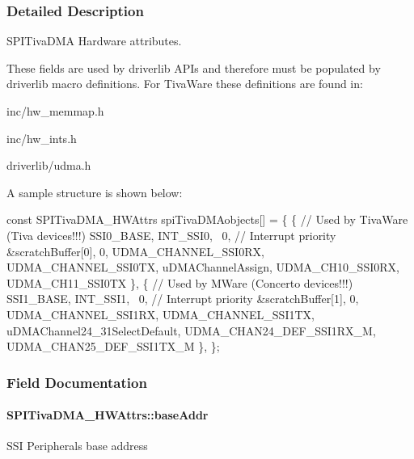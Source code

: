\subsubsection{Detailed Description}
S\+P\+I\+Tiva\+D\+M\+A Hardware attributes. 

These fields are used by driverlib A\+P\+Is and therefore must be populated by driverlib macro definitions. For Tiva\+Ware these definitions are found in\+:
\begin{DoxyItemize}
\item inc/hw\+\_\+memmap.\+h
\item inc/hw\+\_\+ints.\+h
\item driverlib/udma.\+h
\end{DoxyItemize}

A sample structure is shown below\+: 
\begin{DoxyCode}
\textcolor{keyword}{const} SPITivaDMA_HWAttrs spiTivaDMAobjects[] = \{
    \{   \textcolor{comment}{// Used by TivaWare (Tiva devices!!!)}
        SSI0\_BASE,
        INT\_SSI0,
        ~0,         \textcolor{comment}{// Interrupt priority}
        &scratchBuffer[0],
        0,
        UDMA\_CHANNEL\_SSI0RX,
        UDMA\_CHANNEL\_SSI0TX,
        uDMAChannelAssign,
        UDMA\_CH10\_SSI0RX,
        UDMA\_CH11\_SSI0TX
    \},
    \{   \textcolor{comment}{// Used by MWare (Concerto devices!!!)}
        SSI1\_BASE,
        INT\_SSI1,
        ~0,         \textcolor{comment}{// Interrupt priority}
        &scratchBuffer[1],
        0,
        UDMA\_CHANNEL\_SSI1RX,
        UDMA\_CHANNEL\_SSI1TX,
        uDMAChannel24\_31SelectDefault,
        UDMA\_CHAN24\_DEF\_SSI1RX\_M,
        UDMA\_CHAN25\_DEF\_SSI1TX\_M
    \},
\};
\end{DoxyCode}
 

\subsubsection{Field Documentation}
\paragraph[{base\+Addr}]{ S\+P\+I\+Tiva\+D\+M\+A\+\_\+\+H\+W\+Attrs\+::base\+Addr}\label{struct_s_p_i_tiva_d_m_a___h_w_attrs_a3264130b8293c92d7556f4288da9e6c3}
S\+S\+I Peripheral\textquotesingle{}s base address 
